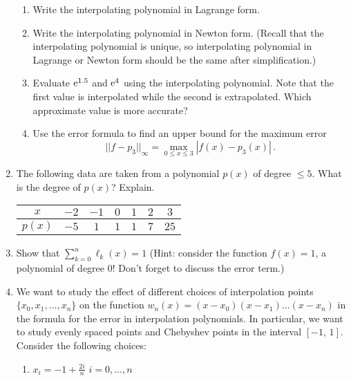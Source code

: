 \documentclass [12pt]{article}
\begin{document}
\begin{enumerate}
\begin{enumerate}
\item
Write the interpolating polynomial in Lagrange form.

\item Write the interpolating polynomial in Newton form. (Recall that the interpolating polynomial is unique, so interpolating polynomial in Lagrange or Newton form should be  the same after simplification.)

\item Evaluate $\mathop{\rm e}\nolimits^{1.5}$ and $\mathop{\rm e}\nolimits^{4}$ using the interpolating
polynomial. Note that the first value is interpolated while the
second is extrapolated. Which approximate value is more accurate?

\item
Use the error formula to find an upper bound for the maximum
error
$$
{||f-p_3||}_{\infty} = \max_{0 \leq x \leq 3} | f(x)-p_3(x)| \,.
$$

\end{enumerate}


\item
The following data are taken from a polynomial $p(x)$ of degree $\leq 5$.
What is the degree of $p(x)$?  Explain. %

\begin{center}
\begin{tabular}{c|cccccc}
$x$ & $-2$ & $-1$ & $0$ & $1$ & $2$ & $3$ \\ \hline
$p(x)$ & $-5$ & $1$ & $1$ & $1$ & $7$ & $25$
\end{tabular}
\end{center}


\item  Show that $\displaystyle \sum_{k=0}^{n} \ell_k(x) = 1 $ \hskip 10pt
(Hint: consider the function $f(x)=1$, a polynomial of degree 0! Don't forget to discuss the error term.)

\item
 We want to study the effect of different choices of interpolation points
$\{ x_0,x_1,\ldots,x_n \}$ on the function
$w_n(x)=(x-x_0)(x-x_1)\ldots(x-x_n)$ in the formula for the error
in interpolation polynomials. In particular, we want to study
evenly spaced points and Chebyshev points in the interval
$[-1,\,1]$. Consider the following choices:

\begin{enumerate}

\item  $x_i=-1+{\displaystyle \frac{2i}{n}}$ \hskip 15pt
$i=0,\ldots,n$


\end{enumerate}
\end{enumerate}
\end{document}
